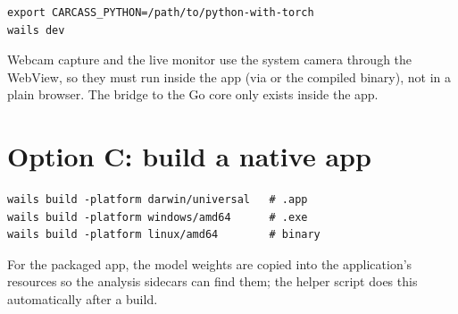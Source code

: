 \begin{lstlisting}
export CARCASS_PYTHON=/path/to/python-with-torch
wails dev
\end{lstlisting}

\begin{note}[title=Camera and the WebView]
Webcam capture and the live monitor use the system camera through the WebView, so
they must run inside the app (via  or the compiled binary), not in
a plain browser. The bridge to the Go core only exists inside the app.
\end{note}

\section{Option C: build a native app}

\begin{lstlisting}
wails build -platform darwin/universal   # .app
wails build -platform windows/amd64      # .exe
wails build -platform linux/amd64        # binary
\end{lstlisting}

For the packaged app, the model weights are copied into the application's
resources so the analysis sidecars can find them; the helper script
 does this automatically after a build.
